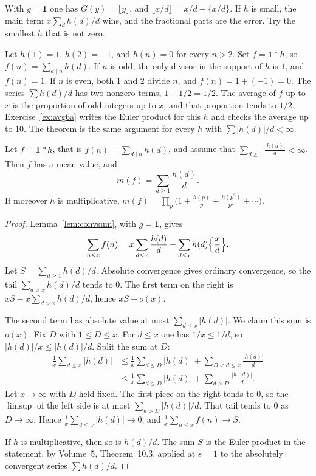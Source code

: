 With $g=\mathbf1$ one has $G(y)=\lfloor y\rfloor$, and $\lfloor x/d\rfloor=x/d-\{x/d\}$. If $h$ is small, the main term $x\sum_d h(d)/d$ wins, and the fractional parts are the error. Try the smallest $h$ that is not zero.

Let $h(1)=1$, $h(2)=-1$, and $h(n)=0$ for every $n>2$. Set $f=\mathbf1*h$, so $f(n)=\sum_{d\mid n}h(d)$. If $n$ is odd, the only divisor in the support of $h$ is $1$, and $f(n)=1$. If $n$ is even, both $1$ and $2$ divide $n$, and $f(n)=1+(-1)=0$. The series $\sum h(d)/d$ has two nonzero terms, $1-1/2=1/2$. The average of $f$ up to $x$ is the proportion of odd integers up to $x$, and that proportion tends to $1/2$. Exercise~\ref{ex:avg6a} writes the Euler product for this $h$ and checks the average up to $10$. The theorem is the same argument for every $h$ with $\sum|h(d)|/d<\infty$.

\begin{theorem}[Wintner, 1943]\label{thm:wintner}
Let $f=\mathbf1*h$, that is $f(n)=\sum_{d\mid n}h(d)$, and assume that $\sum_{d\ge1}\frac{|h(d)|}d<\infty$. Then $f$ has a mean value, and
\[
m(f)=\sum_{d\ge1}\frac{h(d)}d.
\]
If moreover $h$ is multiplicative, $m(f)=\prod_p\bigl(1+\frac{h(p)}p+\frac{h(p^2)}{p^2}+\cdots\bigr)$.
\end{theorem}
\begin{proof}
Lemma~\ref{lem:convsum}, with $g=\mathbf1$, gives
\[
\sum_{n\le x}f(n)=x\sum_{d\le x}\frac{h(d)}d-\sum_{d\le x}h(d)\Bigl\{\frac xd\Bigr\}.
\]
Let $S=\sum_{d\ge1}h(d)/d$. Absolute convergence gives ordinary convergence, so the tail $\sum_{d>x}h(d)/d$ tends to $0$. The first term on the right is $xS-x\sum_{d>x}h(d)/d$, hence $xS+o(x)$.

The second term has absolute value at most $\sum_{d\le x}|h(d)|$. We claim this sum is $o(x)$. Fix $D$ with $1\le D\le x$. For $d\le x$ one has $1/x\le1/d$, so $|h(d)|/x\le|h(d)|/d$. Split the sum at $D$:
\[
\begin{aligned}\frac1x\sum_{d\le x}|h(d)|&\le\frac1x\sum_{d\le D}|h(d)|+\sum_{D<d\le x}\frac{|h(d)|}d\\&\le\frac1x\sum_{d\le D}|h(d)|+\sum_{d>D}\frac{|h(d)|}d.\end{aligned}
\]
Let $x\to\infty$ with $D$ held fixed. The first piece on the right tends to $0$, so the $\limsup$ of the left side is at most $\sum_{d>D}|h(d)|/d$. That tail tends to $0$ as $D\to\infty$. Hence $\frac1x\sum_{d\le x}|h(d)|\to0$, and $\frac1x\sum_{n\le x}f(n)\to S$.

If $h$ is multiplicative, then so is $h(d)/d$. The sum $S$ is the Euler product in the statement, by Volume~5, Theorem~10.3, applied at $s=1$ to the absolutely convergent series $\sum h(d)/d$.
\end{proof}

